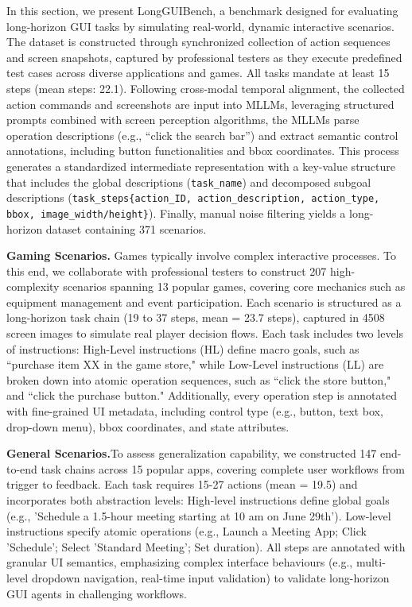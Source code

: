 \documentclass{article} %
\newcommand{\mypara}[1]{\vspace{0.4em}\noindent\textbf{#1}\hspace{0.2cm}}
\begin{document}
In this section, we present LongGUIBench, a benchmark designed for evaluating long-horizon GUI tasks by simulating real-world, dynamic interactive scenarios. The dataset is constructed through synchronized collection of action sequences and screen snapshots, captured by professional testers as they execute predefined test cases across diverse applications and games. All tasks mandate at least 15 steps (mean steps: 22.1). Following cross-modal temporal alignment, the collected action commands and screenshots are input into MLLMs, leveraging structured prompts combined with screen perception algorithms, the MLLMs parse operation descriptions (e.g., ``click the search bar'') and extract semantic control annotations, including button functionalities and bbox coordinates. This process generates a standardized intermediate representation with a key-value structure that includes the global descriptions (\texttt{task\_name}) and decomposed subgoal descriptions (\texttt{task\_steps\{action\_ID, action\_description, action\_type, bbox, image\_width/height\}}). Finally, manual noise filtering yields a long-horizon dataset containing 371 scenarios.

\mypara{Gaming Scenarios.}
Games typically involve complex interactive processes. To this end, we collaborate with professional testers to construct 207 high-complexity scenarios spanning 13 popular games, covering core mechanics such as equipment management and event participation. Each scenario is structured as a long-horizon task chain (19 to 37 steps, mean = 23.7 steps), captured in 4508 screen images to simulate real player decision flows. Each task includes two levels of instructions: High-Level instructions (HL) define macro goals, such as ``purchase item XX in the game store," while Low-Level instructions (LL) are broken down into atomic operation sequences, such as ``click the store button," and ``click the purchase button." Additionally, every operation step is annotated with fine-grained UI metadata, including control type (e.g., button, text box, drop-down menu), bbox coordinates, and state attributes.


\mypara{General Scenarios.}To assess generalization capability, we constructed 147 end-to-end task chains across 15 popular apps, covering complete user workflows from trigger to feedback. Each task requires 15-27 actions (mean = 19.5) and incorporates both abstraction levels: High-level instructions define global goals (e.g., 'Schedule a 1.5-hour meeting starting at 10 am on June 29th'). Low-level instructions specify atomic operations (e.g., Launch a Meeting App; Click 'Schedule'; Select 'Standard Meeting'; Set duration). All steps are annotated with granular UI semantics, emphasizing complex interface behaviours (e.g., multi-level dropdown navigation, real-time input validation) to validate long-horizon GUI agents in challenging workflows.
\end{document}
